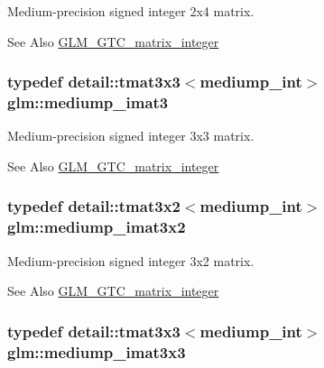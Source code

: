 Medium-\/precision signed integer 2x4 matrix. 

\begin{DoxySeeAlso}{See Also}
\hyperlink{group__gtc__matrix__integer}{G\-L\-M\-\_\-\-G\-T\-C\-\_\-matrix\-\_\-integer} 
\end{DoxySeeAlso}
\hypertarget{group__gtc__matrix__integer_gacb4d126bfdbc9d292e7cdfe6f3e481e6}{
\subsubsection[{mediump\-\_\-imat3}]{\setlength{\rightskip}{0pt plus 5cm}typedef detail\-::tmat3x3$<$mediump\-\_\-int$>$ {\bf glm\-::mediump\-\_\-imat3}}}\label{group__gtc__matrix__integer_gacb4d126bfdbc9d292e7cdfe6f3e481e6}


Medium-\/precision signed integer 3x3 matrix. 

\begin{DoxySeeAlso}{See Also}
\hyperlink{group__gtc__matrix__integer}{G\-L\-M\-\_\-\-G\-T\-C\-\_\-matrix\-\_\-integer} 
\end{DoxySeeAlso}
\hypertarget{group__gtc__matrix__integer_ga91a2f7b0b7ab178581d8e10c56904f5d}{
\subsubsection[{mediump\-\_\-imat3x2}]{\setlength{\rightskip}{0pt plus 5cm}typedef detail\-::tmat3x2$<$mediump\-\_\-int$>$ {\bf glm\-::mediump\-\_\-imat3x2}}}\label{group__gtc__matrix__integer_ga91a2f7b0b7ab178581d8e10c56904f5d}


Medium-\/precision signed integer 3x2 matrix. 

\begin{DoxySeeAlso}{See Also}
\hyperlink{group__gtc__matrix__integer}{G\-L\-M\-\_\-\-G\-T\-C\-\_\-matrix\-\_\-integer} 
\end{DoxySeeAlso}
\hypertarget{group__gtc__matrix__integer_ga648511f44df045d81db55770887b4354}{
\subsubsection[{mediump\-\_\-imat3x3}]{\setlength{\rightskip}{0pt plus 5cm}typedef detail\-::tmat3x3$<$mediump\-\_\-int$>$ {\bf glm\-::mediump\-\_\-imat3x3}}}\label{group__gtc__matrix__integer_ga648511f44df045d81db55770887b4354}


